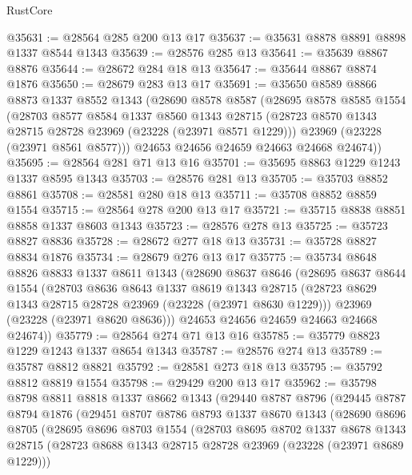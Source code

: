 \begin{lexlean}{RustCore}
\begin{coremodule}
@35631 := @28564 @285 @200 @13 @17
@35637 := @35631 @8878 @8891 @8898 @1337 @8544 @1343
@35639 := @28576 @285 @13
@35641 := @35639 @8867 @8876
@35644 := @28672 @284 @18 @13
@35647 := @35644 @8867 @8874 @1876
@35650 := @28679 @283 @13 @17
@35691 := @35650
    @8589
    @8866
    @8873
    @1337
    @8552
    @1343
    (@28690
      @8578
      @8587
      (@28695
        @8578
        @8585
        @1554
        (@28703
          @8577
          @8584
          @1337
          @8560
          @1343
          @28715
          (@28723 @8570 @1343 @28715 @28728 @23969 (@23228 (@23971 @8571 @1229)))
          @23969
          (@23228 (@23971 @8561 @8577)))
        @24653
        @24656
        @24659
        @24663
        @24668
        @24674))
@35695 := @28564 @281 @71 @13 @16
@35701 := @35695 @8863 @1229 @1243 @1337 @8595 @1343
@35703 := @28576 @281 @13
@35705 := @35703 @8852 @8861
@35708 := @28581 @280 @18 @13
@35711 := @35708 @8852 @8859 @1554
@35715 := @28564 @278 @200 @13 @17
@35721 := @35715 @8838 @8851 @8858 @1337 @8603 @1343
@35723 := @28576 @278 @13
@35725 := @35723 @8827 @8836
@35728 := @28672 @277 @18 @13
@35731 := @35728 @8827 @8834 @1876
@35734 := @28679 @276 @13 @17
@35775 := @35734
    @8648
    @8826
    @8833
    @1337
    @8611
    @1343
    (@28690
      @8637
      @8646
      (@28695
        @8637
        @8644
        @1554
        (@28703
          @8636
          @8643
          @1337
          @8619
          @1343
          @28715
          (@28723 @8629 @1343 @28715 @28728 @23969 (@23228 (@23971 @8630 @1229)))
          @23969
          (@23228 (@23971 @8620 @8636)))
        @24653
        @24656
        @24659
        @24663
        @24668
        @24674))
@35779 := @28564 @274 @71 @13 @16
@35785 := @35779 @8823 @1229 @1243 @1337 @8654 @1343
@35787 := @28576 @274 @13
@35789 := @35787 @8812 @8821
@35792 := @28581 @273 @18 @13
@35795 := @35792 @8812 @8819 @1554
@35798 := @29429 @200 @13 @17
@35962 := @35798
    @8798
    @8811
    @8818
    @1337
    @8662
    @1343
    (@29440
      @8787
      @8796
      (@29445
        @8787
        @8794
        @1876
        (@29451
          @8707
          @8786
          @8793
          @1337
          @8670
          @1343
          (@28690
            @8696
            @8705
            (@28695
              @8696
              @8703
              @1554
              (@28703
                @8695
                @8702
                @1337
                @8678
                @1343
                @28715
                (@28723 @8688 @1343 @28715 @28728 @23969 (@23228 (@23971 @8689 @1229)))

\end{coremodule}
\end{lexlean}
